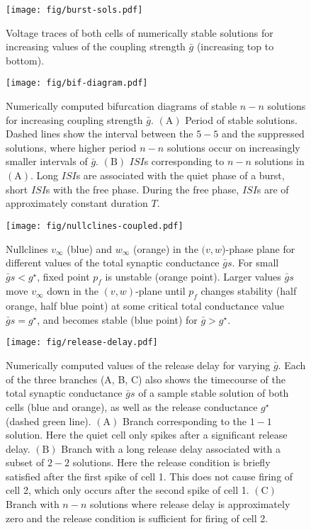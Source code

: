 \documentclass[utf8]{frontiersFPHY} %
\newcommand{\gbar}{\bar g}
\begin{document}
\begin{figure}[h!]
  \centering
  \texttt{[image: fig/burst-sols.pdf]}
  \caption{Voltage traces of both cells of numerically stable solutions for increasing values of the coupling strength $\gbar$ (increasing top to bottom).~\label{fig:burst-sols}}
\end{figure}

\begin{figure}[h!]
  \centering
  \texttt{[image: fig/bif-diagram.pdf]}
  \caption{Numerically computed bifurcation diagrams of stable $n-n$ solutions for increasing coupling strength $\gbar$. $\bm{\mathrm{(A)}}$ Period of stable solutions. Dashed lines show the interval between the $5-5$ and the suppressed solutions, where higher period $n-n$ solutions occur on increasingly smaller intervals of $\gbar$. $\bm{\mathrm{(B)}}$ $ISI$s corresponding to $n-n$ solutions in $\mathrm{(A)}$. Long $ISI$s are associated with the quiet phase of a burst, short $ISI$s with the free phase. During the free phase, $ISI$s are of approximately constant duration $T$.\label{fig:bif-diagram}}
\end{figure}

\begin{figure}[h!]
  \centering
  \texttt{[image: fig/nullclines-coupled.pdf]}
  \caption{Nullclines $v_{\infty}$ (blue) and $w_{\infty}$ (orange) in the $(v,w$)-phase plane for different values of the total synaptic conductance $\gbar s$. For small $\gbar s < g^{\star}$, fixed point $p_{f}$ is unstable (orange point). Larger values $\gbar s$ move $v_{\infty}$ down in the $(v,w)$-plane until $p_{f}$ changes stability (half orange,  half blue point) at some critical total conductance value $\gbar s = g^{\star}$, and becomes stable (blue point) for $\gbar>g^{\star}$.~\label{fig:nullclines-coupled}}
\end{figure}

\begin{figure}[h!]
  \centering
  \texttt{[image: fig/release-delay.pdf]}
  \caption{Numerically computed values of the release delay for varying $\gbar$. Each of the three branches (A, B, C) also shows the timecourse of the total synaptic conductance $\gbar s$ of a sample stable solution of both cells (blue and orange), as well as the release conductance $g^{\star}$ (dashed green line). $\bm{\mathrm{(A)}}$ Branch corresponding to the $1-1$ solution. Here the quiet cell only spikes after a significant release delay. $\bm{\mathrm{(B)}}$ Branch with a long release delay associated with a subset of $2-2$ solutions. Here the release condition is briefly satisfied after the first spike of cell 1. This does not cause firing of cell 2, which only occurs after the second spike of cell 1. $\bm{\mathrm{(C)}}$ Branch with $n-n$ solutions  where release delay is approximately zero and the release condition is sufficient for firing of cell 2.
   ~\label{fig:release-delay}}
\end{figure}
\end{document}
